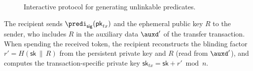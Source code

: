 \begin{figure}[!htb]
\centering
{}
\caption{Interactive protocol for generating unlinkable predicates.}
\label{fig:private-interactive}
\end{figure}

The recipient sends $\predi_\mathsf{sig}(\mathsf{pk}_{tx})$ and the ephemeral public key $R$ to the sender, who includes $R$ in the auxiliary data $\auxd'$ of the transfer transaction. When spending the received token, the recipient reconstructs the blinding factor $r' = H(\mathsf{sk} \,\|\, R)$ from the persistent private key and $R$ (read from $\auxd'$), and computes the transaction-specific private key $\mathsf{sk}_{tx} = \mathsf{sk} + r' \bmod n$.


